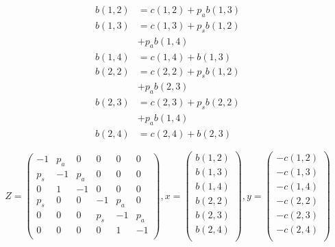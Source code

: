 \begin{minipage}{.5\textwidth}
    \begin{figure}[H]
        \scalebox{0.6}{}
        \caption{
        }
        \label{fig:example_algeb_blocking}
    \end{figure}
    \end{minipage}
    \begin{minipage}{.43\textwidth}
    \begin{align}
        b(1,2) &= c(1,2) + p_a b(1,3) \label{eq:first_eq_of_blocking_example} \\
        b(1,3) &= c(1,3) + p_s b(1,2) \nonumber \\ &+ p_a b(1,4) \\
        b(1,4) &= c(1,4) + b(1,3) \\
        b(2,2) &= c(2,2) + p_s b(1,2) \nonumber \\ &+ p_a b(2,3) \\
        b(2,3) &= c(2,3) + p_s b(2,2) \nonumber \\ &+ p_a b(1,4) \\
        b(2,4) &= c(2,4) + b(2,3) \label{eq:last_eq_of_blocking_example}
    \end{align}
\end{minipage}

\begin{equation}\label{eq:example_algebaric_approach_blocking_time}
    Z=
    \begin{pmatrix}
        -1 & p_a & 0 & 0 & 0 & 0 \\ %
        p_s & -1 & p_a & 0 & 0 & 0 \\ %
        0 & 1 & -1 & 0 & 0 & 0 \\ %
        p_s & 0 & 0 & -1 & p_a & 0\\ %
        0 & 0 & 0 & p_s & -1 & p_a \\ %
        0 & 0 & 0 & 0 & 1 & -1 \\ %
    \end{pmatrix},
    x=
    \begin{pmatrix}
        b(1,2) \\
        b(1,3) \\
        b(1,4) \\
        b(2,2) \\
        b(2,3) \\
        b(2,4) \\
    \end{pmatrix}, 
    y=
    \begin{pmatrix}
        -c(1,2) \\
        -c(1,3) \\
        -c(1,4) \\
        -c(2,2) \\
        -c(2,3) \\
        -c(2,4) \\
    \end{pmatrix}
\end{equation}
